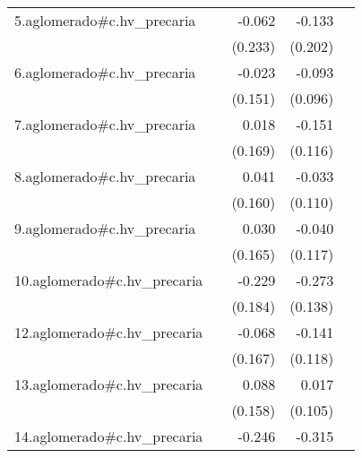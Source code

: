 {\begin{longtable}{l*{4}{D{.}{.}{-1}}}
\addlinespace
5.aglomerado#c.hv\_precaria&                     &      -0.062         &      -0.133         &                     \\
            &                     &     (0.233)         &     (0.202)         &                     \\
\addlinespace
6.aglomerado#c.hv\_precaria&                     &      -0.023         &      -0.093         &                     \\
            &                     &     (0.151)         &     (0.096)         &                     \\
\addlinespace
7.aglomerado#c.hv\_precaria&                     &       0.018         &      -0.151         &                     \\
            &                     &     (0.169)         &     (0.116)         &                     \\
\addlinespace
8.aglomerado#c.hv\_precaria&                     &       0.041         &      -0.033         &                     \\
            &                     &     (0.160)         &     (0.110)         &                     \\
\addlinespace
9.aglomerado#c.hv\_precaria&                     &       0.030         &      -0.040         &                     \\
            &                     &     (0.165)         &     (0.117)         &                     \\
\addlinespace
10.aglomerado#c.hv\_precaria&                     &      -0.229         &      -0.273\sym{*}  &                     \\
            &                     &     (0.184)         &     (0.138)         &                     \\
\addlinespace
12.aglomerado#c.hv\_precaria&                     &      -0.068         &      -0.141         &                     \\
            &                     &     (0.167)         &     (0.118)         &                     \\
\addlinespace
13.aglomerado#c.hv\_precaria&                     &       0.088         &       0.017         &                     \\
            &                     &     (0.158)         &     (0.105)         &                     \\
\addlinespace
14.aglomerado#c.hv\_precaria&                     &      -0.246         &      -0.315         &                     \\

\end{longtable}}
